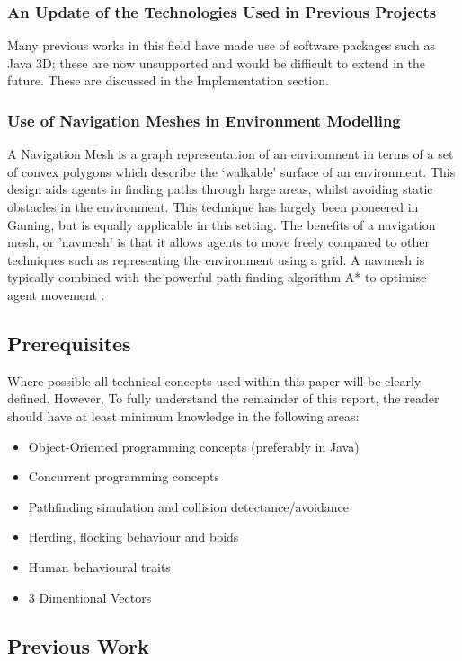 \subsubsection{An Update of the Technologies Used in Previous Projects}
Many previous works in this field have made use of software packages such as Java 3D; these are now unsupported and 
would be difficult to extend in the future.
These are discussed in the Implementation section.

\subsubsection{Use of Navigation Meshes in Environment Modelling}
A Navigation Mesh is a graph representation of an environment in terms of a set of convex polygons which describe the `walkable' surface of an environment. This design aids agents in finding paths through large areas, whilst avoiding static obstacles in the environment.
This technique has largely been pioneered in Gaming, but is equally applicable in this setting. The benefits of a navigation mesh, or 'navmesh' is that it allows agents to move 
freely compared to other techniques such as representing the environment using a grid. A navmesh is typically combined with the powerful path finding algorithm A* to 
optimise agent movement \cite{A*Review}.

\subsection{Prerequisites}
Where possible all technical concepts used within this paper will be clearly defined. However, To fully understand the remainder of this report, the reader should have at least
minimum knowledge in the following areas:
\begin{itemize}
 \item Object-Oriented programming concepts (preferably in Java)
 \item Concurrent programming concepts
 \item Pathfinding simulation and collision detectance/avoidance~\cite{gameProgramming}~\cite{collisionDetection}
 \item Herding, flocking behaviour and boids~\cite{HAndBoid}~\cite{Fbehavior}
 \item Human behavioural traits~\cite{HumanBehaviouralTraits}
 \item 3 Dimentional Vectors
\end{itemize}

\subsection{Previous Work}

